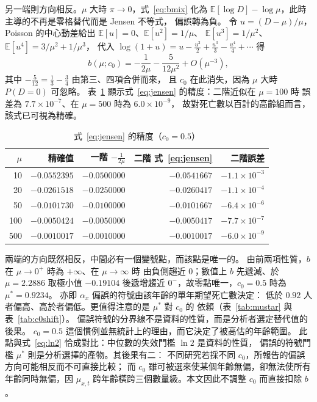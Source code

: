 \documentclass[UTF8, fontset=macnew, a4paper, 12pt]{ctexart}
\newcommand{\Ex}{\mathbb{E}}
\begin{document}
另一端則方向相反。$\mu$ 大時 $\pi\to0$，式~\eqref{eq:bmix} 化為
$\Ex[\log D]-\log\mu$，此時主導的不再是零格替代而是 Jensen 不等式，
偏誤轉為負。
令 $u=(D-\mu)/\mu$， Poisson 的中心動差給出 $\Ex[u]=0$、$\Ex[u^2]=1/\mu$、
$\Ex[u^3]=1/\mu^2$、$\Ex[u^4]=3/\mu^2+1/\mu^3$，
代入 $\log(1+u)=u-\tfrac{u^2}2+\tfrac{u^3}3-\tfrac{u^4}4+\cdots$ 得
\begin{equation}\label{eq:jensen}
b(\mu;c_0)=-\frac{1}{2\mu}-\frac{5}{12\mu^{2}}+O(\mu^{-3}),
\end{equation}
其中 $-\tfrac5{12}=\tfrac13-\tfrac34$ 由第三、四項合併而來，
且 $c_0$ 在此消失，因為 $\mu$ 大時 $P(D=0)$ 可忽略。
表~\ref{tab:asym} 顯示式~\eqref{eq:jensen} 的精度：二階近似在 $\mu=100$ 時
誤差為 $7.7\times10^{-7}$、在 $\mu=500$ 時為 $6.0\times10^{-9}$，
故對死亡數以百計的高齡組而言，該式已可視為精確。

\begin{table}[H]
\centering
\caption{式~\eqref{eq:jensen} 的精度（$c_0=0.5$）}
\small
\begin{tabular}{rrrrr}
\toprule
$\mu$ & 精確值 & 一階 $-\frac{1}{2\mu}$ & 二階 式~\eqref{eq:jensen} & 二階誤差\\
\midrule
10   & $-0.0552395$ & $-0.0500000$ & $-0.0541667$ & $-1.1\times10^{-3}$\\
20   & $-0.0261518$ & $-0.0250000$ & $-0.0260417$ & $-1.1\times10^{-4}$\\
50   & $-0.0101730$ & $-0.0100000$ & $-0.0101667$ & $-6.4\times10^{-6}$\\
100  & $-0.0050424$ & $-0.0050000$ & $-0.0050417$ & $-7.7\times10^{-7}$\\
500  & $-0.0010017$ & $-0.0010000$ & $-0.0010017$ & $-6.0\times10^{-9}$\\
\bottomrule
\end{tabular}
\label{tab:asym}
\end{table}

兩端的方向既然相反，中間必有一個變號點，而該點是唯一的。
由前兩項性質，$b$ 在 $\mu\to0^{+}$ 時為 $+\infty$、在 $\mu\to\infty$ 時
由負側趨近 $0$；數值上 $b$ 先遞減、於 $\mu=2.2886$ 取極小值 $-0.19104$
後遞增趨近 $0^{-}$，故零點唯一，$c_0=0.5$ 時為 $\mu^\ast=0.9234$。
亦即 $\alpha_x$ 偏誤的符號由該年齡的單年期望死亡數決定：
低於 $0.92$ 人者偏高、高於者偏低。更值得注意的是 $\mu^\ast$ 對 $c_0$ 的
依賴（表~\ref{tab:mustar} 與表~\ref{tab:c0shift}）。
偏誤符號的分界線不是資料的性質，而是分析者選定替代值的後果。
$c_0=0.5$ 這個慣例並無統計上的理由，而它決定了被高估的年齡範圍。
此點與式~\eqref{eq:ln2} 恰成對比：中位數的失效門檻 $\ln 2$ 是資料的性質，
偏誤的符號門檻 $\mu^\ast$ 則是分析選擇的產物。其後果有二：
不同研究若採不同 $c_0$，所報告的偏誤方向可能相反而不可直接比較；
而 $c_0$ 雖可被選來使某個年齡無偏，卻無法使所有年齡同時無偏，因 $\mu_{x,t}$ 跨年齡橫跨三個數量級。本文因此不調整 $c_0$ 而直接扣除 $b$。
\end{document}
